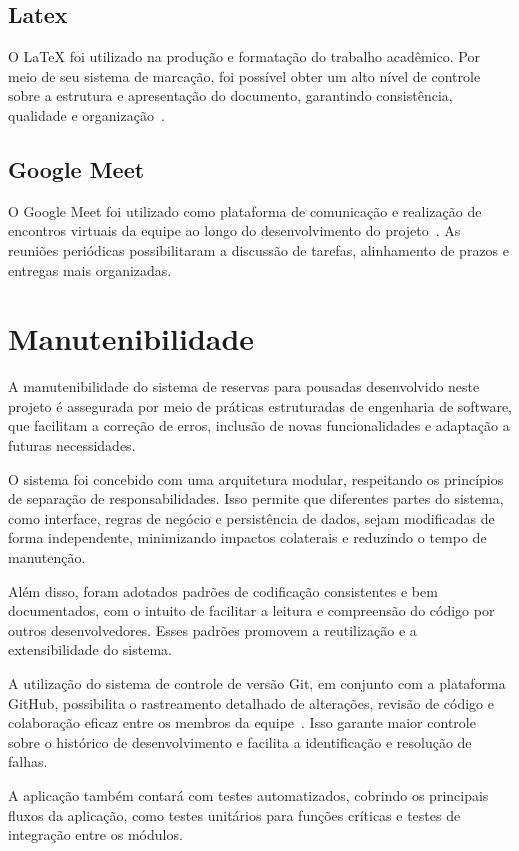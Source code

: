 \documentclass[
	12pt,				%
	openany,			%
	twoside,			%
	a4paper,			%
	english,			%
	french,				%
	spanish,			%
	brazil				%
	]{abntex2}
\begin{document}
\subsection{Latex}
O LaTeX foi utilizado na produção e formatação do trabalho acadêmico. Por meio de seu sistema de marcação, foi possível obter um alto nível de controle sobre a estrutura e apresentação do documento, garantindo consistência, qualidade e organização~\cite{latex-project}.

\subsection{Google Meet}
O Google Meet foi utilizado como plataforma de comunicação e realização de encontros virtuais da equipe ao longo do desenvolvimento do projeto~\cite{google-meet}. As reuniões periódicas possibilitaram a discussão de tarefas, alinhamento de prazos e entregas mais organizadas.

\section{Manutenibilidade}
A manutenibilidade do sistema de reservas para pousadas desenvolvido neste projeto é assegurada por meio de práticas estruturadas de engenharia de software, que facilitam a correção de erros, inclusão de novas funcionalidades e adaptação a futuras necessidades.

O sistema foi concebido com uma arquitetura modular, respeitando os princípios de separação de responsabilidades. Isso permite que diferentes partes do sistema, como interface, regras de negócio e persistência de dados, sejam modificadas de forma independente, minimizando impactos colaterais e reduzindo o tempo de manutenção.

Além disso, foram adotados padrões de codificação consistentes e bem documentados, com o intuito de facilitar a leitura e compreensão do código por outros desenvolvedores. Esses padrões promovem a reutilização e a extensibilidade do sistema.

A utilização do sistema de controle de versão Git, em conjunto com a plataforma GitHub, possibilita o rastreamento detalhado de alterações, revisão de código e colaboração eficaz entre os membros da equipe~\cite{github-doc}. Isso garante maior controle sobre o histórico de desenvolvimento e facilita a identificação e resolução de falhas.

A aplicação também contará com testes automatizados, cobrindo os principais fluxos da aplicação, como testes unitários para funções críticas e testes de integração entre os módulos.
\end{document}
